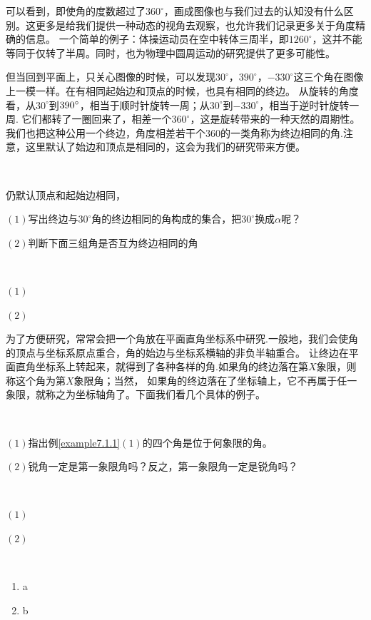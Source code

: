 可以看到，即使角的度数超过了$360^\circ$，画成图像也与我们过去的认知没有什么区别。这更多是给我们提供一种动态的视角去观察，也允许我们记录更多关于角度精确的信息。
一个简单的例子：体操运动员在空中转体三周半，即$1260^\circ$，这并不能等同于仅转了半周。同时，也为物理中圆周运动的研究提供了更多可能性。

但当回到平面上，只关心图像的时候，可以发现$30^\circ$，$390^\circ$，$-330^\circ$这三个角在图像上一模一样。在有相同起始边和顶点的时候，也具有相同的终边。
从旋转的角度看，从$30^\circ$到$390^\circ$，相当于顺时针旋转一周；从$30^\circ$到$-330^\circ$，相当于逆时针旋转一周.
它们都转了一圈回来了，相差一个$360^\circ$，这是旋转带来的一种天然的周期性。
我们也把这种公用一个终边，角度相差若干个$360$的一类角称为终边相同的角.注意，这里默认了始边和顶点是相同的，这会为我们的研究带来方便。
\begin{example}
    \ 

仍默认顶点和起始边相同，

    $(1)$写出终边与$30^\circ$角的终边相同的角构成的集合，把$30^\circ$换成$\alpha$呢？

    $(2)$判断下面三组角是否互为终边相同的角
\end{example}
\begin{jie}
    \ 
    
    $(1)$

    $(2)$


\end{jie}

为了方便研究，常常会把一个角放在平面直角坐标系中研究.一般地，我们会使角的顶点与坐标系原点重合，角的始边与坐标系横轴的非负半轴重合。
让终边在平面直角坐标系上转起来，就得到了各种各样的角.如果角的终边落在第$X$象限，则称这个角为第$X$象限角；当然，
如果角的终边落在了坐标轴上，它不再属于任一象限，就称之为坐标轴角了。下面我们看几个具体的例子。
\begin{example}
    \ 
    
    $(1)$指出例\ref{example7.1.1}$(1)$的四个角是位于何象限的角。

    $(2)$锐角一定是第一象限角吗？反之，第一象限角一定是锐角吗？
\end{example}
\begin{jie}
    \ 

    $(1)$

    $(2)$
\end{jie}

\begin{example}
    \ 

    \begin{enumerate}
        \item a
        \item b
    \end{enumerate}

\end{example}


